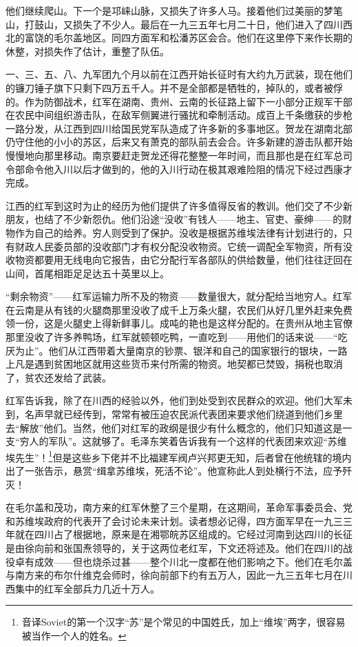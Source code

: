 \documentclass[10pt]{book}
\begin{document}
他们继续爬山。下一个是邛崃山脉，又损失了许多人马。接着他们过美丽的梦笔山，打鼓山，又损失了不少人。最后在一九三五年七月二十日，他们进入了四川西北的富饶的毛尔盖地区。同四方面军和松潘苏区会合。他们在这里停下来作长期的休整，对损失作了估计，重整了队伍。

一、三、五、八、九军团九个月以前在江西开始长征时有大约九万武装，现在他们的镰刀锤子旗下只剩下四万五千人。并不是全部都是牺牲的，掉队的，或者被俘的。作为防御战术，红军在湖南、贵州、云南的长征路上留下一小部分正规军干部在农民中间组织游击队，在敌军侧翼进行骚扰和牵制活动。成百上千条缴获的步枪一路分发，从江西到四川给国民党军队造成了许多新的多事地区。贺龙在湖南北部仍守住他的小小的苏区，后来又有萧克的部队前去会合。许多新建的游击队都开始慢慢地向那里移动。南京要赶走贺龙还得花整整一年时间，而且那也是在红军总司令部命令他入川以后才做到的，他的入川行动在极其艰难险阻的情况下经过西康才完成。

江西的红军到这时为止的经历为他们提供了许多值得反省的教训。他们交了不少新朋友，也结了不少新怨仇。他们沿途“没收”有钱人——地主、官吏、豪绅——的财物作为自己的给养。穷人则受到了保护。没收是根据苏维埃法律有计划进行的，只有财政人民委员部的没收部门才有权分配没收物资。它统一调配全军物资，所有没收物资都要用无线电向它报告，由它分配行军各部队的供给数量，他们往往迂回在山间，首尾相距足足达五十英里以上。

“剩余物资”——红军运输力所不及的物资——数量很大，就分配给当地穷人。红军在云南是从有钱的火腿商那里没收了成千上万条火腿，农民们从好几里外赶来免费领一份，这是火腿史上得新鲜事儿。成吨的艳也是这样分配的。在贵州从地主官僚那里没收了许多养鸭场，红军就顿顿吃鸭，一直吃到——用他们的话来说——“吃厌为止”。他们从江西带着大量南京的钞票、银洋和自己的国家银行的银块，一路上凡是遇到贫困地区就用这些货币来付所需的物资。地契都已焚毁，捐税也取消了，贫农还发给了武装。

红军告诉我，除了在川西的经验以外，他们到处受到农民群众的欢迎。他们大军未到，名声早就已经传到，常常有被压迫农民派代表团来要求他们绕道到他们乡里去“解放”他们。当然，他们对红军的政纲是很少有什么概念的，他们只知道这是一支“穷人的军队”。这就够了。毛泽东笑着告诉我有一个这样的代表团来欢迎“苏维埃先生”！\footnote{音译Soviet的第一个汉字“苏”是个常见的中国姓氏，加上“维埃”两字，很容易被当作一个人的姓名。}但是这些乡下佬并不比福建军阀卢兴邦更无知，后者曾在他统辖的境内出了一张告示，悬赏“缉拿苏维埃，死活不论”。他宣称此人到处横行不法，应予歼灭！

在毛尔盖和茂功，南方来的红军休整了三个星期，在这期间，革命军事委员会、党和苏维埃政府的代表开了会讨论未来计划。读者想必记得，四方面军早在一九三三年就在四川占了根据地，原来是在湘鄂皖苏区组成的。它经过河南到达四川的长征是由徐向前和张国焘领导的，关于这两位老红军，下文还将述及。他们在四川的战役卓有成效——但也烧杀过甚——整个川北一度都在他们影响之下。他们在毛尔盖与南方来的布尔什维克会师时，徐向前部下约有五万人，因此一九三五年七月在川西集中的红军全部兵力几近十万人。
\end{document}
